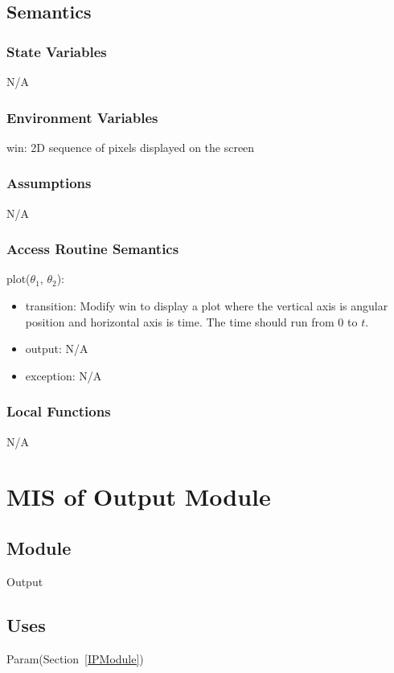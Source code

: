 \documentclass[12pt, titlepage]{article}
\begin{document}
\subsection{Semantics}

\subsubsection{State Variables}
N/A

\subsubsection{Environment Variables}

win: 2D sequence of pixels displayed on the screen\\

\subsubsection{Assumptions}
N/A
\subsubsection{Access Routine Semantics}

\noindent plot($\theta_1$, $\theta_2$):
\begin{itemize}
\item transition: Modify win to display a plot where the vertical axis
  is angular position and horizontal axis is time. The time should run from $0$ to $t$.
\item output: N/A
\item exception: N/A
\end{itemize}

\subsubsection{Local Functions}

N/A
\newpage


\section{MIS of Output Module} \label{OModule} 

\subsection{Module}

Output

\subsection{Uses}
Param(Section~\ref{IPModule})
\end{document}
